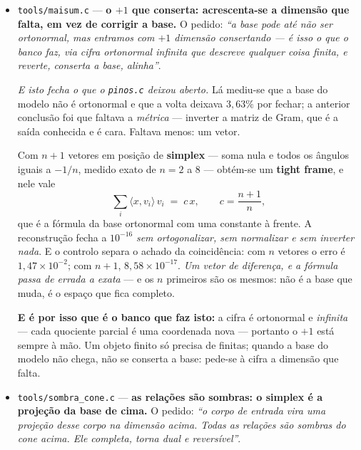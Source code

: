 \documentclass[11pt]{article}
\newcommand{\code}[1]{\texttt{\small #1}}
\theoremstyle{plain}
\theoremstyle{remark}
\begin{document}
\begin{itemize}
\textbf{E LOAD/STORE são a mesma matriz nos dois sentidos} --- o \code{ve} e o \code{poe} do
\code{plugue.sh} --- com uma correção que a medida obriga: como as colunas \emph{não} são
ortogonais, corrigir só a escala aproxima e não fecha (deixa $3{,}63\%$ por fechar). A base é
\textbf{oblíqua}, e a volta precisa da \emph{métrica} dela --- a inversa de Gram --- não apenas das
normas na diagonal.

\item \code{tools/maisum.c} --- \textbf{o $+1$ que conserta: acrescenta-se a dimensão que falta,
em vez de corrigir a base.} O pedido: \emph{``a base pode até não ser ortonormal, mas entramos com
$+1$ dimensão consertando --- é isso o que o banco faz, via cifra ortonormal infinita que descreve
qualquer coisa finita, e reverte, conserta a base, alinha''}.

\emph{E isto fecha o que o \code{pinos.c} deixou aberto.} Lá mediu-se que a base do modelo não é
ortonormal e que a volta deixava $3{,}63\%$ por fechar; a anterior conclusão foi que faltava a
\emph{métrica} --- inverter a matriz de Gram, que é a saída conhecida e é cara. Faltava menos: um
vetor.

Com $n{+}1$ vetores em posição de \textbf{simplex} --- soma nula e todos os ângulos iguais a
$-1/n$, medido exato de $n=2$ a $8$ --- obtém-se um \textbf{tight frame}, e nele vale
\[
 \sum_i \langle x, v_i\rangle\, v_i \;=\; c\,x, \qquad c=\frac{n+1}{n},
\]
que é a fórmula da base ortonormal com uma constante à frente. A reconstrução fecha a $10^{-16}$
\emph{sem ortogonalizar, sem normalizar e sem inverter nada}. E o controlo separa o achado da
coincidência: com $n$ vetores o erro é $1{,}47\times10^{-2}$; com $n{+}1$, $8{,}58\times10^{-17}$.
\emph{Um vetor de diferença, e a fórmula passa de errada a exata} --- e os $n$ primeiros são os
mesmos: não é a base que muda, é o espaço que fica completo.

\textbf{E é por isso que é o banco que faz isto:} a cifra é ortonormal e \emph{infinita} --- cada
quociente parcial é uma coordenada nova --- portanto o $+1$ está sempre à mão. Um objeto finito só
precisa de finitas; quando a base do modelo não chega, não se conserta a base: pede-se à cifra a
dimensão que falta.

\item \code{tools/sombra\_cone.c} --- \textbf{as relações são sombras: o simplex é a projeção da
base de cima.} O pedido: \emph{``o corpo de entrada vira uma projeção desse corpo na dimensão acima.
Todas as relações são sombras do cone acima. Ele completa, torna dual e reversível''}.


\end{itemize}
\end{document}
